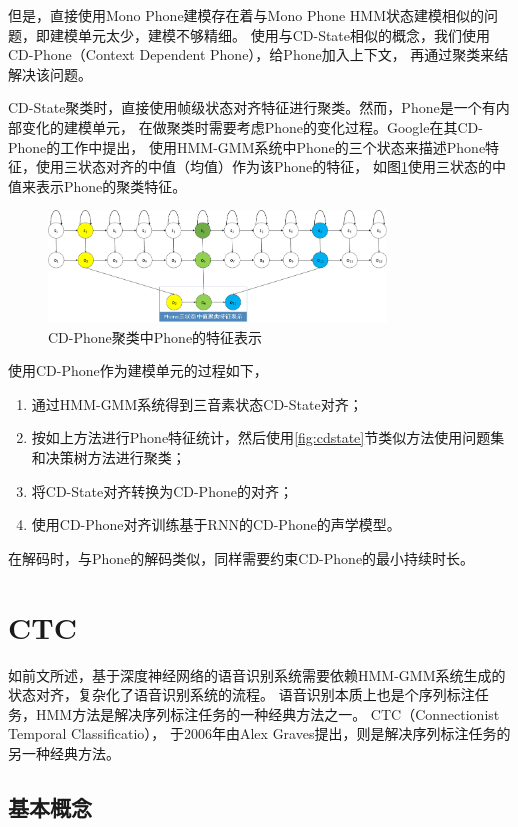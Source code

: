 但是，直接使用Mono Phone建模存在着与Mono Phone HMM状态建模相似的问题，即建模单元太少，建模不够精细。
使用与CD-State相似的概念，我们使用CD-Phone（Context Dependent Phone），给Phone加入上下文，
再通过聚类来结解决该问题。

CD-State聚类时，直接使用帧级状态对齐特征进行聚类。然而，Phone是一个有内部变化的建模单元，
在做聚类时需要考虑Phone的变化过程。Google在其CD-Phone的工作中提出，
使用HMM-GMM系统中Phone的三个状态来描述Phone特征，使用三状态对齐的中值（均值）作为该Phone的特征，
如图\ref{fig:3middle}使用三状态的中值来表示Phone的聚类特征。

\begin{figure}[htbp]
\centering
\includegraphics[width=0.8\textwidth]{figures/chapter4/3middle-crop}
\caption{CD-Phone聚类中Phone的特征表示}
\label{fig:3middle}
\end{figure}


使用CD-Phone作为建模单元的过程如下，
\begin{enumerate}
\item 通过HMM-GMM系统得到三音素状态CD-State对齐；
\item 按如上方法进行Phone特征统计，然后使用\ref{fig:cdstate}节类似方法使用问题集和决策树方法进行聚类；
\item 将CD-State对齐转换为CD-Phone的对齐；
\item 使用CD-Phone对齐训练基于RNN的CD-Phone的声学模型。
\end{enumerate}
在解码时，与Phone的解码类似，同样需要约束CD-Phone的最小持续时长。


\section{CTC}

如前文所述，基于深度神经网络的语音识别系统需要依赖HMM-GMM系统生成的状态对齐，复杂化了语音识别系统的流程。
语音识别本质上也是个序列标注任务，HMM方法是解决序列标注任务的一种经典方法之一。
CTC（Connectionist Temporal Classificatio），
于2006年由Alex Graves提出，则是解决序列标注任务的另一种经典方法。

\subsection{基本概念}

